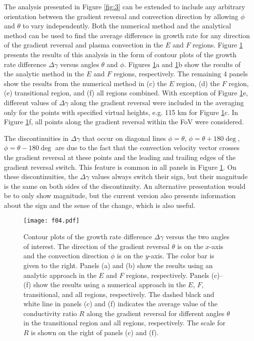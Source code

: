 The analysis presented in Figure \ref{fig:3} can be extended to include any arbitrary orientation between the gradient reversal and convection direction by allowing \(\phi\) and \(\theta\) to vary independently.  Both the numerical method and the analytical method can be used to find the average difference in growth rate for any direction of the gradient reversal and plasma convection in the \(E\) and \(F\) regions.  Figure \ref{fig:4} presents the results of this analysis in the form of contour plots of the growth rate difference \(\Delta\gamma\) versus angles \(\theta\) and \(\phi\). Figures \ref{fig:4}a and \ref{fig:4}b show the results of the analytic method in the \(E\) and \(F\) regions, respectively. The remaining 4 panels show the results from the numerical method in (c) the \(E\) region, (d) the \(F\) region, (e) transitional region, and (f) all regions combined. With exception of Figure \ref{fig:4}e, different values of \(\Delta\gamma\) along the gradient reversal were included in the averaging only for the points with specified virtual heights, e.g. 115 km for Figure \ref{fig:4}c. In Figure \ref{fig:4}f, all points along the gradient reversal within the FoV were considered.

The discontinuities in \(\Delta\gamma\) that occur on diagonal lines \(\phi=\theta\), \(\phi=\theta+180\deg\), \(\phi=\theta-180\deg\) are due to the fact that the convection velocity vector crosses the gradient reversal at these points and the leading and trailing edges of the gradient reversal switch.  This feature is common in all panels in Figure \ref{fig:4}. On these discontinuities, the \(\Delta\gamma\) values always switch their sign, but their magnitude is the same on both sides of the discontinuity. An alternative presentation would be to only show magnitude, but the current version also presents information about the sign and the sense of the change, which is also useful.

\begin{figure}
	\centering
	\texttt{[image: f04.pdf]}
	\caption[GDI growth rates for arbitrary angle between \(\vec{V}_E\) and \(\vec{G}\)]{Contour plots of the growth rate difference \(\Delta\gamma\)  versus the two angles of interest. The direction of the gradient reversal \(\theta\) is on the \(x\)-axis and the convection direction \(\phi\) is on the \(y\)-axis.  The color bar is given to the right. Panels (a) and (b) show the results using an analytic approach in the \(E\) and \(F\) regions, respectively.  Panels (c)--(f) show the results using a numerical approach in the \(E\), \(F\), transitional, and all regions, respectively. The dashed black and white line in panels (c) and (f) indicates the average value of the conductivity ratio \(R\) along the gradient reversal for different angles \(\theta\) in the transitional region and all regions, respectively. The scale for \(R\) is shown on the right of panels (c) and (f).}
	\label{fig:4}
\end{figure}

